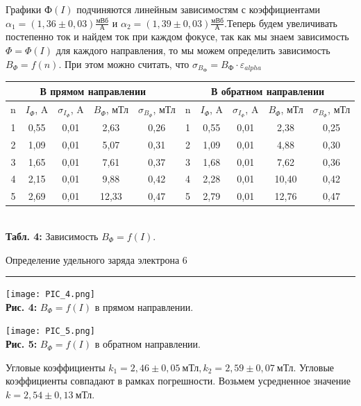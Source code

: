 \documentclass[12pt,a4paper]{scrartcl}
\begin{document}
Графики $\text{Ф}(I)$ подчиняются линейным зависимостям с коэффициентами $\alpha_1 = (1,36 \pm 0,03) \frac{\text{мВб}}{\text{А}}$ и $\alpha_2 = (1,39 \pm 0,03) \frac{\text{мВб}}{\text{А}}$.Теперь будем увеличивать постепенно ток и найдем ток при каждом фокусе, так как мы знаем зависимость $\Phi = \Phi(I)$ для каждого направления, то мы можем определить зависимость $B_{\Phi} = f(n)$. При этом можно считать, что $\sigma_{B_{\text{Ф}}} = B_{\text{Ф}} \cdot \varepsilon_{alpha}$
\begin{center}
\begin{tabular}{|c|c|c|c|c|c|c|c|c|c|}
\hline
\multicolumn{5}{|c|}{В прямом направлении} & \multicolumn{5}{c|}{В обратном направлении} \\ \hline
n & $I_{\Phi}$, A & $\sigma_{I_{\Phi}}$, A & $B_{\Phi}$, мТл & $\sigma_{B_{\Phi}}$, мТл & n & $I_{\Phi}$, A & $\sigma_{I_{\Phi}}$, A & $B_{\Phi}$, мТл & $\sigma_{B_{\Phi}}$, мТл \\ \hline
1 & 0,55 & 0,01 & 2,63 & 0,26 & 1 & 0,55 & 0,01 & 2,38 & 0,25 \\ \hline
2 & 1,09 & 0,01 & 5,07 & 0,31 & 2 & 1,09 & 0,01 & 4,88 & 0,30 \\ \hline
3 & 1,65 & 0,01 & 7,61 & 0,37 & 3 & 1,68 & 0,01 & 7,62 & 0,36 \\ \hline
4 & 2,15 & 0,01 & 9,88 & 0,42 & 4 & 2,28 & 0,01 & 10,40 & 0,42 \\ \hline
5 & 2,69 & 0,01 & 12,33 & 0,47 & 5 & 2,79 & 0,01 & 12,76 & 0,47 \\ \hline
\end{tabular}\\
\textbf{Табл. 4:} Зависимость $B_{\Phi} = f(I)$.
\end{center}  
  
 	\newpage
	
	\begin{flushleft}
		\footnotesize{Определение удельного заряда электрона} \hspace{\fill} \footnotesize{6}
		\\[-0.3cm]\noindent\rule{\textwidth}{0.3pt}
	\end{flushleft} 
  
\begin{center}
\texttt{[image: PIC\_4.png]}\\
\textbf{Рис. 4: } $B_{\Phi} = f(I)$ в прямом направлении.
\end{center}
\begin{center}
\texttt{[image: PIC\_5.png]}\\
\textbf{Рис. 5: } $B_{\Phi} = f(I)$ в обратном направлении.
\end{center}
Угловые коэффициенты $k_1 = 2,46 \pm 0,05 \ \text{мТл}, k_2 = 2,59 \pm 0,07 \ \text{мТл}.$ Угловые коэффициенты совпадают в рамках погрешности. Возьмем усредненное значение $k = 2,54 \pm 0,13 \ \text{мТл}$.
\end{document}

